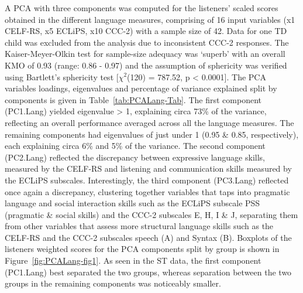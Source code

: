 \documentclass[a4paper, twoside]{templates/ociamthesis}
\begin{document}
A PCA with three components was computed for the listeners' scaled scores obtained in the different language measures, comprising of 16 input variables (x1 CELF-RS, x5 ECLiPS, x10 CCC-2) with a sample size of 42. Data for one TD child was excluded from the analysis due to inconsistent CCC-2 responses. The Kaiser-Meyer-Olkin test for sample-size adequacy was `superb' \autocite{Field2012Chpt17} with an overall KMO of 0.93 (range: 0.86 - 0.97) and the assumption of sphericity was verified using Bartlett's sphericity test {[}\(\chi^2\)(120) = 787.52, p \textless{} 0.0001{]}. The PCA variables loadings, eigenvalues and percentage of variance explained split by components is given in Table~\ref{tab:PCALang-Tab}. The first component (PC1.Lang) yielded eigenvalue \textgreater{} 1, explaining circa 73\% of the variance, reflecting an overall performance averaged across all the language measures. The remaining components had eigenvalues of just under 1 (0.95 \& 0.85, respectively), each explaining circa 6\% and 5\% of the variance. The second component (PC2.Lang) reflected the discrepancy between expressive language skills, measured by the CELF-RS and listening and communication skills measured by the ECLiPS subscales. Interestingly, the third component (PC3.Lang) reflected once again a discrepancy, clustering together variables that taps into pragmatic language and social interaction skills such as the ECLiPS subscale PSS (pragmatic \& social skills) and the CCC-2 subscales E, H, I \& J, separating them from other variables that assess more structural language skills such as the CELF-RS and the CCC-2 subscales speech (A) and Syntax (B). Boxplots of the listeners weighted scores for the PCA components split by group is shown in Figure~\ref{fig:PCALang-fig1}. As seen in the ST data, the first component (PC1.Lang) best separated the two groups, whereas separation between the two groups in the remaining components was noticeably smaller.\\
\end{document}
